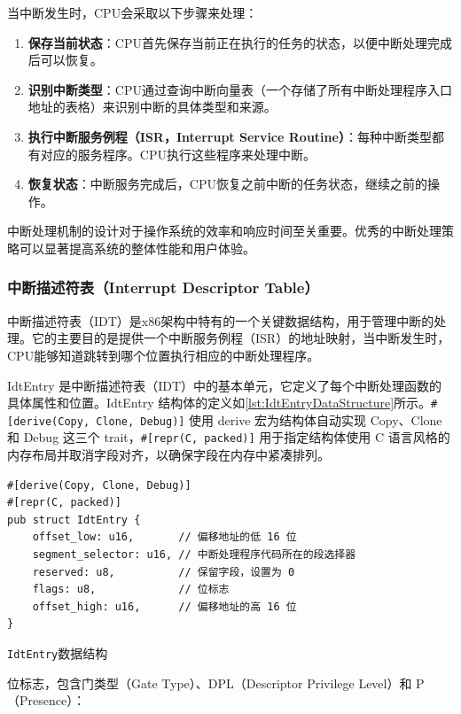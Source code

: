 当中断发生时，CPU会采取以下步骤来处理：

\begin{enumerate}
    \item \textbf{保存当前状态}：CPU首先保存当前正在执行的任务的状态，以便中断处理完成后可以恢复。
    \item \textbf{识别中断类型}：CPU通过查询中断向量表（一个存储了所有中断处理程序入口地址的表格）来识别中断的具体类型和来源。
    \item \textbf{执行中断服务例程（ISR，Interrupt Service Routine）}：每种中断类型都有对应的服务程序。CPU执行这些程序来处理中断。
    \item \textbf{恢复状态}：中断服务完成后，CPU恢复之前中断的任务状态，继续之前的操作。
\end{enumerate}

中断处理机制的设计对于操作系统的效率和响应时间至关重要。优秀的中断处理策略可以显著提高系统的整体性能和用户体验。

\subsubsection{中断描述符表（Interrupt Descriptor Table）}

中断描述符表（IDT）是x86架构中特有的一个关键数据结构，用于管理中断的处理。它的主要目的是提供一个中断服务例程（ISR）的地址映射，当中断发生时，CPU能够知道跳转到哪个位置执行相应的中断处理程序。

IdtEntry 是中断描述符表（IDT）中的基本单元，它定义了每个中断处理函数的具体属性和位置。IdtEntry 结构体的定义如\cref{lst:IdtEntryDataStructure}所示。\texttt{\#[derive(Copy, Clone, Debug)]} 使用 derive 宏为结构体自动实现 Copy、Clone 和 Debug 这三个 trait，\texttt{\#[repr(C, packed)]} 用于指定结构体使用 C 语言风格的内存布局并取消字段对齐，以确保字段在内存中紧凑排列。

\begin{listing}[htbp]
    \begin{verbatim}
#[derive(Copy, Clone, Debug)]
#[repr(C, packed)]
pub struct IdtEntry {
    offset_low: u16,       // 偏移地址的低 16 位
    segment_selector: u16, // 中断处理程序代码所在的段选择器
    reserved: u8,          // 保留字段，设置为 0
    flags: u8,             // 位标志
    offset_high: u16,      // 偏移地址的高 16 位
}
    \end{verbatim}
    \caption{\texttt{IdtEntry}数据结构}\label{lst:IdtEntryDataStructure}
\end{listing}

位标志，包含门类型（Gate Type）、DPL（Descriptor Privilege Level）和 P（Presence）：

